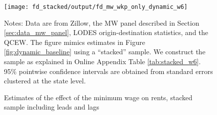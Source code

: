 
\begin{figure}[h!]
    \centering
    \caption{Estimates of the effect of the minimum wage on rents, stacked sample including
             leads and lags}
    \label{fig:dynamic_stacked}

    \texttt{[image: fd\_stacked/output/fd\_mw\_wkp\_only\_dynamic\_w6]}

    \begin{minipage}{.95\textwidth} \footnotesize
        \vspace{3mm}
        Notes:
        Data are from Zillow,
        the MW panel described in Section \ref{sec:data_mw_panel},
        LODES origin-destination statistics,
        and the QCEW.
        The figure mimics estimates in Figure \ref{fig:dynamic_baseline} 
        using a ``stacked'' sample.
        We construct the sample as explained in Online Appendix Table 
        \ref{tab:stacked_w6}.
        95\% pointwise confidence intervals are obtained from standard errors 
        clustered at the state level.
    \end{minipage}
\end{figure}
